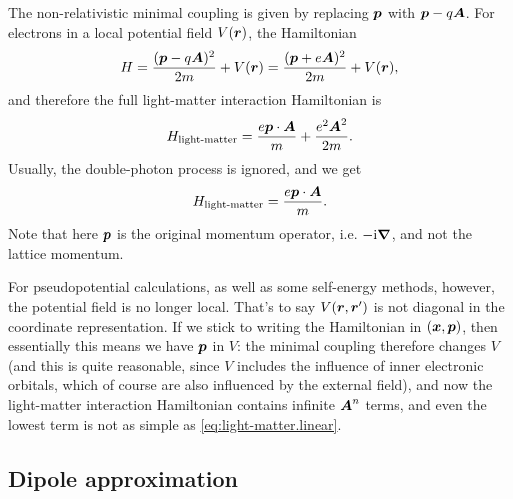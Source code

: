 \documentclass[hyperref, a4paper, 12pt]{report}
\newcommand*{\ii}{\mathrm{i}}
\begin{document}
The non-relativistic minimal coupling is given by replacing $\vb*{p}$ with $\vb*{p} - q \vb*{A}$.
For electrons in a local potential field $V(\vb*{r})$, 
the Hamiltonian 
\begin{equation}
    H = \frac{(\vb*{p} - q \vb*{A})^2}{2m} + V(\vb*{r}) = \frac{(\vb*{p} + e \vb*{A})^2}{2m} + V(\vb*{r}),
\end{equation}
and therefore the full light-matter interaction Hamiltonian is 
\begin{equation}
    H_{\text{light-matter}} = \frac{e \vb*{p} \cdot \vb*{A}}{m} + \frac{e^2 \vb*{A}^2}{2m}.
\end{equation}
Usually, the double-photon process is ignored, and we get 
\begin{equation}
    H_{\text{light-matter}} = \frac{e \vb*{p} \cdot \vb*{A}}{m}.
    \label{eq:light-matter.linear}
\end{equation}
Note that here $\vb*{p}$ is the original momentum operator, i.e. $- \ii \grad$,
and not the lattice momentum.

For pseudopotential calculations, 
as well as some self-energy methods, 
however, the potential field is no longer local.
That's to say $V(\vb*{r}, \vb*{r}')$ is not diagonal in the coordinate representation.
If we stick to writing the Hamiltonian in $(\vb*{x}, \vb*{p})$,
then essentially this means we have $\vb*{p}$ in $V$:
the minimal coupling therefore changes $V$
(and this is quite reasonable,
since $V$ includes the influence of inner electronic orbitals,
which of course are also influenced by the external field),
and now the light-matter interaction Hamiltonian 
contains infinite $\vb*{A}^n$ terms,
and even the lowest term is not as simple as \eqref{eq:light-matter.linear}.

\subsection{Dipole approximation}
\end{document}
